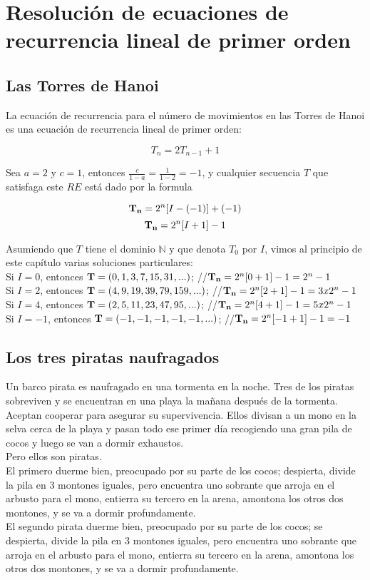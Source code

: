 \documentclass{article}
\begin{document}
\section{Resolución de ecuaciones de recurrencia lineal de primer orden}

\subsection{Las Torres de Hanoi}

La ecuación de recurrencia para el número de movimientos en las Torres de Hanoi es una ecuación de recurrencia lineal de primer orden:

$$T_n = 2 T_{n-1} + 1$$

Sea $a=2$ y $c=1$, entonces $\frac{c}{1-a} = \frac{1}{1-2} = -1$, y cualquier secuencia $T$ que satisfaga este $RE$ está dado por la formula

$${\bf T_{n}} = 2^{n}[I - (-1)] + (-1)$$
$${\bf T_{n}} = 2^{n}[I + 1] - 1$$

Asumiendo que $T$ tiene el dominio $\mathbb{N}$ y que denota $T_0$ por $I$, vimos al principio de este capítulo varias soluciones particulares:\\

Si $I=0$, entonces ${\bf T}= (0,1,3,7,15,31,...)$; \;\;  //${\bf T_n} = 2^{n}[0+1] - 1 = 2^n -1$ \\

Si $I=2$, entonces ${\bf T}= (4,9,19,39,79,159,...)$; \;\; //${\bf T_n} = 2^{n}[2+1] - 1 = 3x2^n -1$ \\

Si $I=4$, entonces ${\bf T}= (2,5,11,23,47,95,...)$; \;\;  //${\bf T_n} = 2^{n}[4+1] - 1 = 5x2^n -1$ \\

Si $I=-1$, entonces ${\bf T}= (-1,-1,-1,-1,-1,...)$; \;\;  //${\bf T_n} = 2^{n}[-1+1] - 1 =  -1$ 


\subsection{Los tres piratas naufragados}

Un barco pirata es naufragado en una tormenta en la noche. Tres de los piratas sobreviven y se encuentran en una playa la mañana después de la tormenta. Aceptan cooperar para asegurar su supervivencia. Ellos divisan a un mono en la selva cerca de la playa y pasan todo ese primer día recogiendo una gran pila de cocos y luego se van a dormir exhaustos.\\
Pero ellos son piratas.\\
El primero duerme bien, preocupado por su parte de los cocos; despierta, divide la pila en 3 montones iguales, pero encuentra uno sobrante que arroja en el arbusto para el mono, entierra su tercero en la arena, amontona los otros dos montones, y se va a dormir profundamente.\\
El segundo pirata duerme bien, preocupado por su parte de los cocos; se despierta, divide la pila en 3 montones iguales, pero encuentra uno sobrante que arroja en el arbusto para el mono, entierra su tercero en la arena, amontona los otros dos montones, y se va a dormir profundamente.\\
\end{document}
